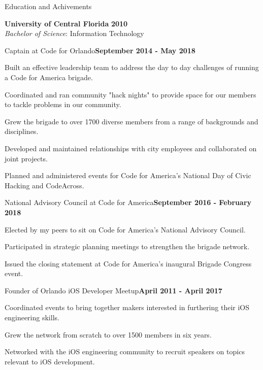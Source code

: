 \documentclass{resume} %
\begin{document}
\begin{rSection}{Education and Achivements}

    {\bf University of Central Florida} \hfill {\bf 2010} \\ 
    {\it Bachelor of Science}: Information Technology \\

\begin{rSubsection}{Captain at Code for Orlando}{\bf September 2014 - May 2018}{}{}

\item Built an effective leadership team to address the day to day challenges of running a Code for America brigade.
\item Coordinated and ran community "hack nights" to provide space for our members to tackle problems in our community.
\item Grew the brigade to over 1700 diverse members from a range of backgrounds and disciplines.
\item Developed and maintained relationships with city employees and collaborated on joint projects.
\item Planned and administered events for Code for America's National Day of Civic Hacking and CodeAcross.


\end{rSubsection}

\begin{rSubsection}{National Advisory Council at Code for America}{\bf September 2016 - February 2018}{}{}

\item Elected by my peers to sit on Code for America's National Advisory Council.
\item Participated in strategic planning meetings to strengthen the brigade network.
\item Issued the closing statement at Code for America's inaugural Brigade Congress event.


\end{rSubsection}

\begin{rSubsection}{Founder of Orlando iOS Developer Meetup}{\bf April 2011 - April 2017}{}{}

\item Coordinated events to bring together makers interested in furthering their iOS engineering skills.
\item Grew the network from scratch to over 1500 members in six years.
\item Networked with the iOS engineering community to recruit speakers on topics relevant to iOS development.


\end{rSubsection}

\end{rSection}
\end{document}
